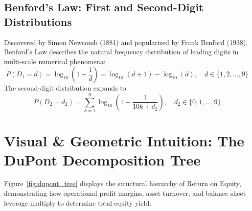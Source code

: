 \subsection{Benford's Law: First and Second-Digit Distributions}
Discovered by Simon Newcomb (1881) and popularized by Frank Benford (1938), Benford's Law describes the natural frequency distribution of leading digits in multi-scale numerical phenomena:
\begin{equation}
P(D_1 = d) = \log_{10}\left(1 + \frac{1}{d}\right) = \log_{10}(d + 1) - \log_{10}(d), \quad d \in \{1, 2, \dots, 9\}
\label{eq:benford_1st}
\end{equation}
The second-digit distribution expands to:
\begin{equation}
P(D_2 = d_2) = \sum_{k=1}^9 \log_{10}\left(1 + \frac{1}{10k + d_2}\right), \quad d_2 \in \{0, 1, \dots, 9\}
\label{eq:benford_2nd}
\end{equation}

\section{Visual \& Geometric Intuition: The DuPont Decomposition Tree}

Figure~\ref{fig:dupont_tree} displays the structural hierarchy of Return on Equity, demonstrating how operational profit margins, asset turnover, and balance sheet leverage multiply to determine total equity yield.

